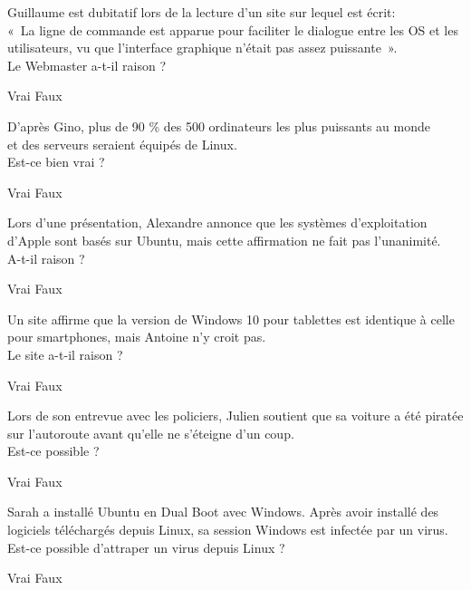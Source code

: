 \documentclass[12pt, a4paper]{exam}
\begin{document}

  \vspace{1cm}

  \begin{questions}
    \question Guillaume est dubitatif lors de la lecture d’un site sur lequel
    est écrit: \\
    « La ligne de commande est apparue pour faciliter le dialogue entre les OS
    et les utilisateurs, vu que l’interface graphique n’était pas assez
    puissante ». \\
    Le Webmaster a-t-il raison ?
    \begin{checkboxes}
      \choice Vrai
      \choice Faux
    \end{checkboxes}

    \question D’après Gino, plus de 90 \% des 500 ordinateurs les plus puissants
    au monde \\et des serveurs seraient équipés de Linux. \\
    Est-ce bien vrai ?
    \begin{checkboxes}
      \choice Vrai
      \choice Faux
    \end{checkboxes}

    \question Lors d’une présentation, Alexandre annonce que les systèmes
    d’exploitation d’Apple sont basés sur Ubuntu, mais cette affirmation ne fait
    pas l’unanimité. \\
    A-t-il raison ?
    \begin{checkboxes}
      \choice Vrai
      \choice Faux
    \end{checkboxes}

    \question Un site affirme que la version de Windows 10 pour tablettes est
    identique à celle pour smartphones, mais Antoine n’y croit pas. \\
    Le site a-t-il raison ?
    \begin{checkboxes}
      \choice Vrai
      \choice Faux
    \end{checkboxes}

    \question Lors de son entrevue avec les policiers, Julien soutient que sa
    voiture a été piratée sur l’autoroute avant qu’elle ne s’éteigne d’un coup. \\
    Est-ce possible ?
    \begin{checkboxes}
      \choice Vrai
      \choice Faux
    \end{checkboxes}

    \question Sarah a installé Ubuntu en Dual Boot avec Windows. Après avoir
    installé des logiciels téléchargés depuis Linux, sa session Windows est
    infectée par un virus. \\
    Est-ce possible d’attraper un virus depuis Linux ?
    \begin{checkboxes}
      \choice Vrai
      \choice Faux
    \end{checkboxes}


\end{questions}
\end{document}
